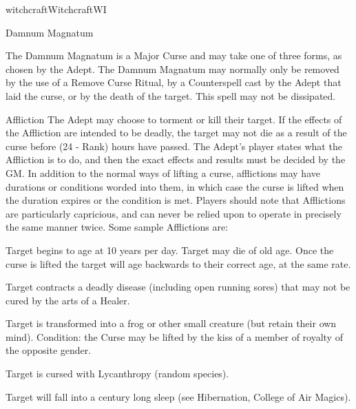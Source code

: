 \begin{college}[1.1]{witchcraft}{Witchcraft}{WI}
\begin{spell}[S-10]{Damnum Magnatum}

\begin{effects}
The Damnum Magnatum is a Major Curse and may take one of three forms,
as chosen by the Adept.  The Damnum Magnatum may normally only be
removed by the use of a Remove Curse Ritual, by a Counterspell cast by
the Adept that laid the curse, or by the death of the target.  This
spell may not be dissipated.

\begin{Description}
\item[Affliction]
The Adept may choose to torment or kill their target.  If the effects
of the Affliction are intended to be deadly, the target may not die as
a result of the curse before (24 - Rank) hours have passed.  The
Adept's player states what the Affliction is to do, and then the exact
effects and results must be decided by the GM.  In addition to the
normal ways of lifting a curse, afflictions may have durations or
conditions worded into them, in which case the curse is lifted when
the duration expires or the condition is met.  Players should note
that Afflictions are particularly capricious, and can never be relied
upon to operate in precisely the same manner twice.  Some sample
Afflictions are:
\begin{Enumerate}
\item
Target begins to age at 10 years per day.  Target may die of old age.
Once the curse is lifted the target will age backwards to their
correct age, at the same rate.

\item
Target contracts a deadly disease (including open running sores) that
may not be cured by the arts of a Healer.

\item  
Target is transformed into a frog or other small creature (but retain
their own mind).  Condition: the Curse may be lifted by the kiss of a
member of royalty of the opposite gender.

\item
Target is cursed with Lycanthropy (random species).

\item
 Target will fall into a century long sleep (see Hibernation, College
of Air Magics).
\end{Enumerate}


\end{Description}
\end{effects}
\end{spell}
\end{college}
